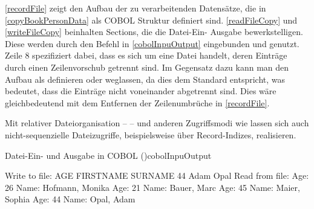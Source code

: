 

\autoref{recordFile} zeigt den Aufbau der zu verarbeitenden Datensätze, die in \autoref{copyBookPersonData} als COBOL Struktur definiert sind. \autoref{readFileCopy} und \autoref{writeFileCopy} beinhalten Sections, die die Datei-Ein- \bzw Ausgabe bewerkstelligen. Diese werden durch den  Befehl in \autoref{cobolInpuOutput} eingebunden und genutzt. Zeile 8 spezifiziert dabei, dass es sich um eine Datei handelt, deren Einträge durch einen Zeilenvorschub getrennt sind. Im Gegensatz dazu kann man den Aufbau als  \bzw {} definieren oder weglassen, da dies dem Standard entspricht, was bedeutet, dass die Einträge nicht voneinander abgetrennt sind. Dies wäre gleichbedeutend mit dem Entfernen der Zeilenumbrüche in \autoref{recordFile}.



Mit relativer Dateiorganisation --  -- und anderen Zugriffsmodi wie  lassen sich auch nicht-sequenzielle Dateizugriffe, beispielsweise über Record-Indizes, realisieren.

\begin{codeWithCaption}{Datei-Ein- und Ausgabe in COBOL (\vgl \cite{university_of_limerick_department})}{cobolInpuOutput}
    \begin{shellwindow}
    Write to file:
    AGE FIRSTNAME SURNAME
     44      Adam    Opal
    Read from file:
    Age:  26 Name: Hofmann,    Monika
    Age:  21 Name:   Bauer,      Marc
    Age:  45 Name:   Maier,    Sophia
    Age:  44 Name:    Opal,      Adam
    \end{shellwindow}
\end{codeWithCaption}